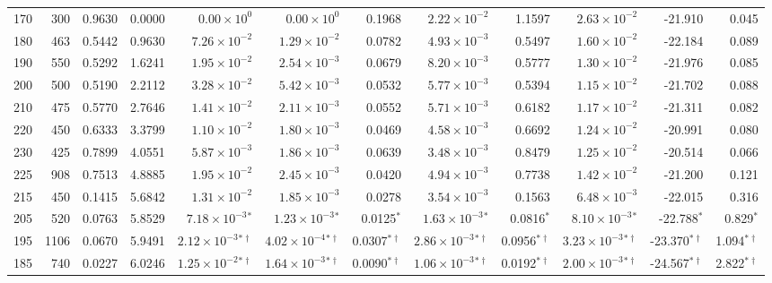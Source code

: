 \begin{landscape}
\begin{footnotesize}
\begin{longtable}{r r r r r r r r r r r r}
170 & 300 & 0.9630 & 0.0000 & \(0.00\!\times\!10^{0}\) & \(0.00\!\times\!10^{0}\) & 0.1968 & \(2.22\!\times\!10^{-2}\) & 1.1597 & \(2.63\!\times\!10^{-2}\) & -21.910 & 0.045 \\
180 & 463 & 0.5442 & 0.9630 & \(7.26\!\times\!10^{-2}\) & \(1.29\!\times\!10^{-2}\) & 0.0782 & \(4.93\!\times\!10^{-3}\) & 0.5497 & \(1.60\!\times\!10^{-2}\) & -22.184 & 0.089 \\
190 & 550 & 0.5292 & 1.6241 & \(1.95\!\times\!10^{-2}\) & \(2.54\!\times\!10^{-3}\) & 0.0679 & \(8.20\!\times\!10^{-3}\) & 0.5777 & \(1.30\!\times\!10^{-2}\) & -21.976 & 0.085 \\
200 & 500 & 0.5190 & 2.2112 & \(3.28\!\times\!10^{-2}\) & \(5.42\!\times\!10^{-3}\) & 0.0532 & \(5.77\!\times\!10^{-3}\) & 0.5394 & \(1.15\!\times\!10^{-2}\) & -21.702 & 0.088 \\
210 & 475 & 0.5770 & 2.7646 & \(1.41\!\times\!10^{-2}\) & \(2.11\!\times\!10^{-3}\) & 0.0552 & \(5.71\!\times\!10^{-3}\) & 0.6182 & \(1.17\!\times\!10^{-2}\) & -21.311 & 0.082 \\
220 & 450 & 0.6333 & 3.3799 & \(1.10\!\times\!10^{-2}\) & \(1.80\!\times\!10^{-3}\) & 0.0469 & \(4.58\!\times\!10^{-3}\) & 0.6692 & \(1.24\!\times\!10^{-2}\) & -20.991 & 0.080 \\
230 & 425 & 0.7899 & 4.0551 & \(5.87\!\times\!10^{-3}\) & \(1.86\!\times\!10^{-3}\) & 0.0639 & \(3.48\!\times\!10^{-3}\) & 0.8479 & \(1.25\!\times\!10^{-2}\) & -20.514 & 0.066 \\
225 & 908 & 0.7513 & 4.8885 & \(1.95\!\times\!10^{-2}\) & \(2.45\!\times\!10^{-3}\) & 0.0420 & \(4.94\!\times\!10^{-3}\) & 0.7738 & \(1.42\!\times\!10^{-2}\) & -21.200 & 0.121 \\
215 & 450 & 0.1415 & 5.6842 & \(1.31\!\times\!10^{-2}\) & \(1.85\!\times\!10^{-3}\) & 0.0278 & \(3.54\!\times\!10^{-3}\) & 0.1563 & \(6.48\!\times\!10^{-3}\) & -22.015 & 0.316 \\
205 & 520 & 0.0763 & 5.8529 & \(7.18\!\times\!10^{-3}\)$^*$ & \(1.23\!\times\!10^{-3}\)$^*$ & 0.0125$^*$ & \(1.63\!\times\!10^{-3}\)$^*$ & 0.0816$^*$ & \(8.10\!\times\!10^{-3}\)$^*$ & -22.788$^*$ & 0.829$^*$ \\
195 & 1106 & 0.0670 & 5.9491 & \(2.12\!\times\!10^{-3}\)$^{*\dagger}$ & \(4.02\!\times\!10^{-4}\)$^{*\dagger}$ & 0.0307$^{*\dagger}$ & \(2.86\!\times\!10^{-3}\)$^{*\dagger}$ & 0.0956$^{*\dagger}$ & \(3.23\!\times\!10^{-3}\)$^{*\dagger}$ & -23.370$^{*\dagger}$ & 1.094$^{*\dagger}$ \\
185 & 740 & 0.0227 & 6.0246 & \(1.25\!\times\!10^{-2}\)$^{*\dagger}$ & \(1.64\!\times\!10^{-3}\)$^{*\dagger}$ & 0.0090$^{*\dagger}$ & \(1.06\!\times\!10^{-3}\)$^{*\dagger}$ & 0.0192$^{*\dagger}$ & \(2.00\!\times\!10^{-3}\)$^{*\dagger}$ & -24.567$^{*\dagger}$ & 2.822$^{*\dagger}$ \\

\end{longtable}
\end{footnotesize}
\end{landscape}

